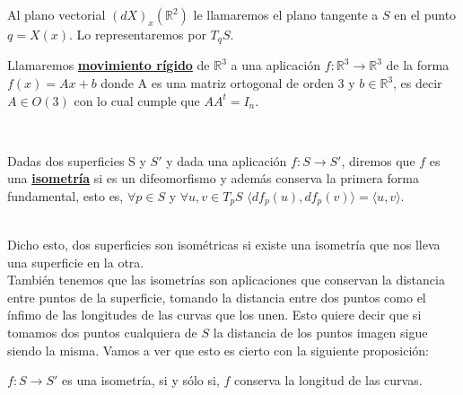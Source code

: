 Al plano vectorial $(dX)_x(\mathbb{R}^2)$ le llamaremos el plano tangente a $S$ en el punto $q = X(x)$. Lo representaremos por $T_q S$.
${ }$\\


\begin{definicion}
	Llamaremos \underline{\textbf{movimiento rígido}} de $\mathbb{R}^3$ a una aplicación $f : \mathbb{R}^3 \to \mathbb{R}^3$ de la forma $f(x) = Ax + b$ donde A es una matriz ortogonal de orden 3 y $b \in \mathbb{R}^3$, es decir $A \in O(3)$ con lo cual cumple que $AA^{t} = I_{n}$.
\end{definicion}
${ }$\\


\begin{definicion}\label{def:isom} %
	Dadas dos superficies S y $S'$ y dada una aplicación $f : S \longrightarrow S'$, diremos que $f$ es una \underline{\textbf{isometría}} si es un difeomorfismo y además conserva la primera forma fundamental, esto es, $\forall p \in S$ y $\forall u,v \in T_p S$ $\langle df_p(u), df_p(v)\rangle = \langle u, v\rangle$.
\end{definicion}
${ }$\\

Dicho esto, dos superficies son isométricas si existe una isometría que nos lleva una superficie en la otra.
	${}$\\
	
También tenemos que las isometrías son aplicaciones que conservan la distancia entre puntos de la superficie, tomando la distancia entre dos puntos como el ínfimo de las longitudes de las curvas que los unen. Esto quiere decir que si tomamos dos puntos cualquiera de $S$ la distancia de los puntos imagen sigue siendo la misma. Vamos a ver que esto es cierto con la siguiente proposición:
${ }$\\

\begin{proposicion}
	$f : S \to S'$ es una isometría, si y sólo si, $f$ conserva la longitud de las curvas.
\end{proposicion}

